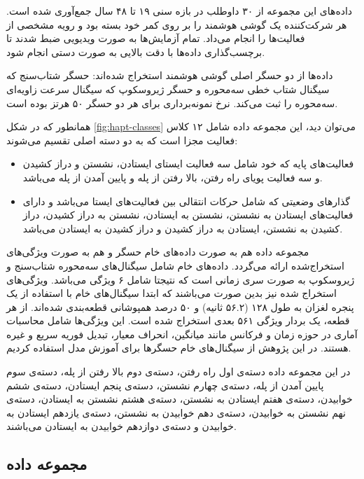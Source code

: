 داده‌های این مجموعه از ۳۰ داوطلب در بازه سنی ۱۹ تا ۴۸ سال جمع‌آوری شده است. هر شرکت‌کننده یک گوشی هوشمند  را بر روی کمر خود بسته بود و رویه مشخصی از فعالیت‌ها را انجام می‌داد. تمام آزمایش‌ها به صورت ویدیویی ضبط شدند تا برچسب‌گذاری داده‌ها با دقت بالایی به صورت دستی انجام شود.

داده‌ها از دو حسگر اصلی گوشی هوشمند استخراج شده‌اند: حسگر شتاب‌سنج که سیگنال شتاب خطی سه‌محوره و حسگر ژیروسکوپ که سیگنال سرعت زاویه‌ای سه‌محوره را ثبت می‌کند. نرخ نمونه‌برداری برای هر دو حسگر ۵۰ هرتز بوده است.

همانطور که در شکل \ref{fig:hapt-classes}
می‌توان دید، این مجموعه داده شامل ۱۲ کلاس فعالیت مجزا است که به دو دسته اصلی تقسیم می‌شوند:
\begin{itemize}
    \item فعالیت‌های پایه که خود شامل سه فعالیت ایستای ایستادن، نشستن و دراز کشیدن و سه فعالیت پویای راه رفتن، بالا رفتن از پله و پایین آمدن از پله می‌باشد.
    \item گذارهای وضعیتی که شامل حرکات انتقالی بین فعالیت‌های ایستا می‌باشد و دارای فعالیت‌های ایستادن به نشستن، نشستن به ایستادن، نشستن به دراز کشیدن، دراز کشیدن به نشستن، ایستادن به دراز کشیدن و دراز کشیدن به ایستادن می‌باشد.
\end{itemize}

مجموعه داده  هم به صورت داده‌های خام حسگر و هم به صورت ویژگی‌های استخراج‌شده ارائه می‌گردد. داده‌های خام شامل سیگنال‌های سه‌محوره شتاب‌سنج و ژیروسکوپ به صورت سری زمانی است که نتیجتا شامل ۶ ویژگی می‌باشد. ویژگی‌های استخراج شده نیز بدین صورت می‌باشند که ابتدا سیگنال‌های خام با استفاده از یک پنجره لغزان به طول ۱۲۸ (۵۶.۲ ثانیه) و ۵۰ درصد همپوشانی قطعه‌بندی شده‌اند. از هر قطعه، یک بردار ویژگی ۵۶۱ بعدی استخراج شده است. این ویژگی‌ها شامل محاسبات آماری در حوزه زمان و فرکانس مانند میانگین، انحراف معیار، تبدیل فوریه سریع و غیره هستند. در این پژوهش از سیگنال‌های خام حسگرها برای آموزش مدل استفاده کردیم.

در این مجموعه داده دسته‌ی اول راه رفتن، دسته‌ی دوم بالا رفتن از پله، دسته‌ی سوم پایین آمدن از پله، دسته‌ی چهارم نشستن، دسته‌ی پنجم ایستادن، دسته‌ی ششم خوابیدن، دسته‌ی هفتم ایستادن به نشستن، دسته‌ی هشتم نشستن به ایستادن، دسته‌ی نهم نشستن به خوابیدن، دسته‌ی دهم خوابیدن به نشستن، دسته‌ی یازدهم ایستادن به خوابیدن و دسته‌ی دوازدهم خوابیدن به ایستادن می‌باشند. 

\subsection{مجموعه داده }

